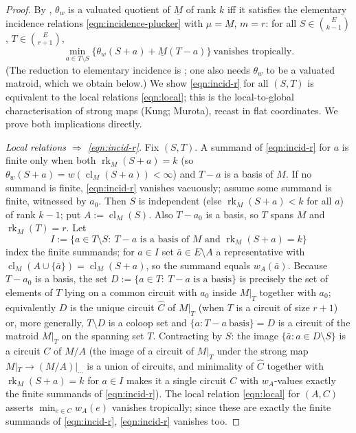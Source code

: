 \documentclass{article}
\theoremstyle{definition}
\newcommand{\rk}{\operatorname{rk}}
\newcommand{\cl}{\operatorname{cl}}
\begin{document}
\begin{proof}
By , $\theta_w$ is a valuated quotient of $\underline M$ of rank $k$ iff it
satisfies the elementary incidence relations \eqref{eqn:incidence-plucker} with $\mu=\underline M$,
$m=r$: for all $S\in\binom{E}{k-1}$, $T\in\binom{E}{r+1}$,
\begin{equation}\label{eqn:incid-r}
  \min_{a\in T\setminus S}\bigl\{\theta_w(S+a)+\underline M(T-a)\bigr\}\ \text{vanishes tropically.}
\end{equation}
(The reduction to elementary incidence is ; one also needs $\theta_w$ to be a
valuated matroid, which we obtain below.) We show \eqref{eqn:incid-r} for all $(S,T)$ is equivalent to
the local relations \eqref{eqn:local}; this is the local-to-global characterisation of strong maps
(Kung; Murota), recast in flat coordinates. We prove both implications directly.

\smallskip
\noindent\emph{Local relations $\Rightarrow$ \eqref{eqn:incid-r}.} Fix $(S,T)$. A summand of
\eqref{eqn:incid-r} for $a$ is finite only when both $\rk_M(S+a)=k$ (so $\theta_w(S+a)=w(\cl_M(S+a))<
\infty$) and $T-a$ is a basis of $M$. If no summand is finite, \eqref{eqn:incid-r} vanishes
vacuously; assume some summand is finite, witnessed by $a_0$. Then $S$ is independent (else
$\rk_M(S+a)<k$ for all $a$) of rank $k-1$; put $A:=\cl_M(S)$. Also $T-a_0$ is a basis, so $T$ spans
$M$ and $\rk_M(T)=r$. Let
\[
  I:=\{a\in T\setminus S:\ T-a\text{ is a basis of }M\text{ and }\rk_M(S+a)=k\}
\]
index the finite summands; for $a\in I$ set $\bar a\in E\setminus A$ a representative with
$\cl_M(A\cup\{\bar a\})=\cl_M(S+a)$, so the summand equals $w_A(\bar a)$. Because $T-a_0$ is a basis,
the set $D:=\{a\in T:\ T-a\text{ is a basis}\}$ is precisely the set of elements of $T$ lying on a
common circuit with $a_0$ inside $M|_T$ together with $a_0$; equivalently $D$ is the unique circuit
$\hat C$ of $M|_T$ (when $T$ is a circuit of size $r+1$) or, more generally, $T\setminus D$ is a
coloop set and $\{a:T-a\ \text{basis}\}=D$ is a circuit of the matroid $M|_T$ on the spanning set $T$.
Contracting by $S$: the image $\{\bar a:a\in D\setminus S\}$ is a circuit $C$ of $M/A$ (the image of a
circuit of $M|_T$ under the strong map $M|_T\to (M/A)|_{\cdots}$ is a union of circuits, and
minimality of $\hat C$ together with $\rk_M(S+a)=k$ for $a\in I$ makes it a single circuit $C$ with
$w_A$-values exactly the finite summands of \eqref{eqn:incid-r}). The local relation
\eqref{eqn:local} for $(A,C)$ asserts $\min_{e\in C}w_A(e)$ vanishes tropically; since these are
exactly the finite summands of \eqref{eqn:incid-r}, \eqref{eqn:incid-r} vanishes too.


\end{proof}
\end{document}
